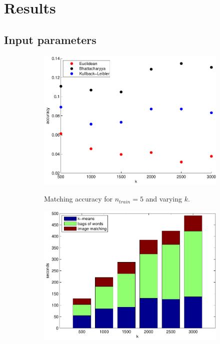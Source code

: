 \documentclass[11pt,a4paper]{article}
\begin{document}
\section{Results}

\subsection{Input parameters}
\begin{figure}[H]
    \centering
    \begin{subfigure}[t]{0.48\textwidth}
        \includegraphics[width=\textwidth]{images/results_k.pdf}
        \label{fig:results_k}
        \caption{Matching accuracy for $n_{train} = 5$ and varying $k$.}
    \end{subfigure}
    \begin{subfigure}[t]{0.48\textwidth}
        \includegraphics[width=\textwidth]{images/results_k_time.pdf}

\end{subfigure}
\end{figure}
\end{document}
